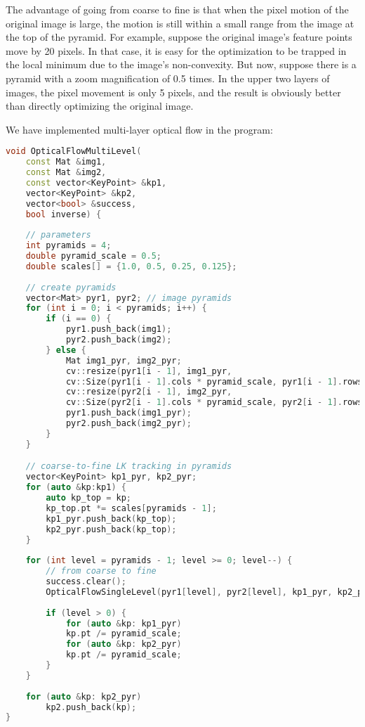 The advantage of going from coarse to fine is that when the pixel motion of the original image is large, the motion is still within a small range from the image at the top of the pyramid. For example, suppose the original image's feature points move by 20 pixels. In that case, it is easy for the optimization to be trapped in the local minimum due to the image's non-convexity. But now, suppose there is a pyramid with a zoom magnification of 0.5 times. In the upper two layers of images, the pixel movement is only 5 pixels, and the result is obviously better than directly optimizing the original image.

We have implemented multi-layer optical flow in the program:
\begin{lstlisting}[language=c++,caption=slambook2/ch8/optical_flow.cpp (part)]
void OpticalFlowMultiLevel(
	const Mat &img1,
	const Mat &img2,
	const vector<KeyPoint> &kp1,
	vector<KeyPoint> &kp2,
	vector<bool> &success,
	bool inverse) {
	
	// parameters
	int pyramids = 4;
	double pyramid_scale = 0.5;
	double scales[] = {1.0, 0.5, 0.25, 0.125};
	
	// create pyramids
	vector<Mat> pyr1, pyr2; // image pyramids
	for (int i = 0; i < pyramids; i++) {
		if (i == 0) {
			pyr1.push_back(img1);
			pyr2.push_back(img2);
		} else {
			Mat img1_pyr, img2_pyr;
			cv::resize(pyr1[i - 1], img1_pyr,
			cv::Size(pyr1[i - 1].cols * pyramid_scale, pyr1[i - 1].rows * pyramid_scale));
			cv::resize(pyr2[i - 1], img2_pyr,
			cv::Size(pyr2[i - 1].cols * pyramid_scale, pyr2[i - 1].rows * pyramid_scale));
			pyr1.push_back(img1_pyr);
			pyr2.push_back(img2_pyr);
		}
	}

	// coarse-to-fine LK tracking in pyramids
	vector<KeyPoint> kp1_pyr, kp2_pyr;
	for (auto &kp:kp1) {
		auto kp_top = kp;
		kp_top.pt *= scales[pyramids - 1];
		kp1_pyr.push_back(kp_top);
		kp2_pyr.push_back(kp_top);
	}
	
	for (int level = pyramids - 1; level >= 0; level--) {
		// from coarse to fine
		success.clear();
		OpticalFlowSingleLevel(pyr1[level], pyr2[level], kp1_pyr, kp2_pyr, success, inverse, true);
		
		if (level > 0) {
			for (auto &kp: kp1_pyr)
			kp.pt /= pyramid_scale;
			for (auto &kp: kp2_pyr)
			kp.pt /= pyramid_scale;
		}
	}
	
	for (auto &kp: kp2_pyr)
		kp2.push_back(kp);
}
\end{lstlisting}

